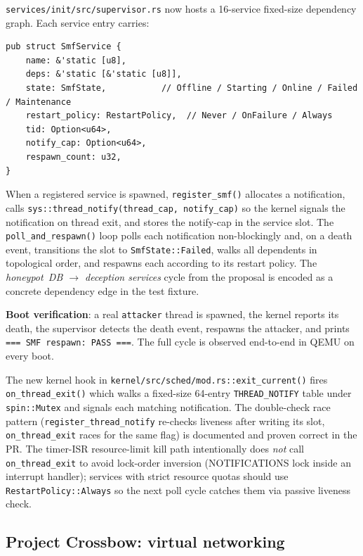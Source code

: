 \documentclass[11pt,a4paper]{article}
\begin{document}
\texttt{services/init/src/supervisor.rs} now hosts a 16-service
fixed-size dependency graph. Each service entry carries:

\begin{lstlisting}
pub struct SmfService {
    name: &'static [u8],
    deps: &'static [&'static [u8]],
    state: SmfState,           // Offline / Starting / Online / Failed / Maintenance
    restart_policy: RestartPolicy,  // Never / OnFailure / Always
    tid: Option<u64>,
    notify_cap: Option<u64>,
    respawn_count: u32,
}
\end{lstlisting}

When a registered service is spawned, \texttt{register\_smf()} allocates
a notification, calls \texttt{sys::thread\_notify(thread\_cap,
notify\_cap)} so the kernel signals the notification on thread exit,
and stores the notify-cap in the service slot. The
\texttt{poll\_and\_respawn()} loop polls each notification non-blockingly
and, on a death event, transitions the slot to
\texttt{SmfState::Failed}, walks all dependents in topological order,
and respawns each according to its restart policy. The
\textit{honeypot~DB $\to$ deception services} cycle from the proposal
is encoded as a concrete dependency edge in the test fixture.

\textbf{Boot verification}: a real \texttt{attacker} thread is spawned,
the kernel reports its death, the supervisor detects the death event,
respawns the attacker, and prints
\verb|=== SMF respawn: PASS ===|. The full cycle is observed
end-to-end in QEMU on every boot.

The new kernel hook in \texttt{kernel/src/sched/mod.rs::exit\_current()}
fires \texttt{on\_thread\_exit()} which walks a fixed-size 64-entry
\texttt{THREAD\_NOTIFY} table under \texttt{spin::Mutex} and signals
each matching notification. The double-check race pattern
(\texttt{register\_thread\_notify} re-checks liveness after writing
its slot, \texttt{on\_thread\_exit} races for the same flag) is
documented and proven correct in the PR. The timer-ISR resource-limit
kill path intentionally does \emph{not} call \texttt{on\_thread\_exit}
to avoid lock-order inversion (NOTIFICATIONS lock inside an interrupt
handler); services with strict resource quotas should use
\texttt{RestartPolicy::Always} so the next poll cycle catches them
via passive liveness check.

\subsection{Project Crossbow: virtual networking}
\end{document}
